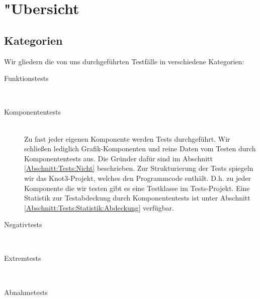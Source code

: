 %



\section{{"U}bersicht}
\label{Abschnitt:Tests:Uebersicht}



\subsection{Kategorien}
\label{Abschnitt:Tests:Uebersicht:Kategorien}

Wir gliedern die von uns durchgeführten Testfälle in verschiedene Kategorien:\\


\begin{description} %


	\item[Funktionstests] \hfill
	\\
	
	
	\item[Komponententests] \hfill
	\\
	
	Zu fast jeder eigenen Komponente werden Tests durchgeführt. Wir schließen lediglich Grafik-Komponenten und reine Daten vom Testen durch Komponententests aus. Die Gründer dafür sind im Abschnitt \ref{Abschnitt:Tests:Nicht} beschrieben. Zur Strukturierung der Tests spiegeln wir das Knot3-Projekt, welches den Programmcode enthält. D.h. zu jeder Komponente die wir testen gibt es eine Testklasse im Tests-Projekt. Eine Statistik zur Testabdeckung durch Komponententests ist unter Abschnitt \ref{Abschnitt:Tests:Statistik:Abdeckung} verfügbar.\\


	\item[Negativtests] \hfill
	\\

	
	\item[Extremtests] \hfill
	\\


	\item[Abnahmetests] \hfill
	\\
		
\end{description}










